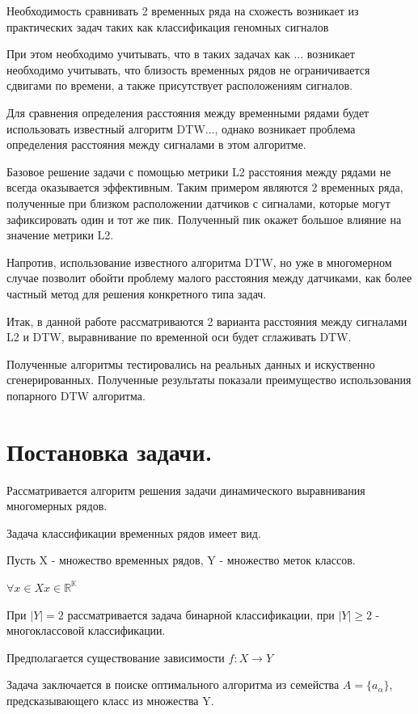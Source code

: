\documentclass[12pt, twoside]{article}
\begin{document}
Необходимость сравнивать 2 временных ряда на схожесть возникает из практических задач таких как классификация геномных сигналов \cite{SalvadorC07} 

При этом необходимо учитывать, что в таких задачах как ... возникает необходимо учитывать, что близость временных рядов не ограничивается сдвигами по времени, а также присутствует  расположениям сигналов.

Для сравнения определения расстояния между временными рядами будет использовать известный алгоритм DTW..., однако возникает проблема определения расстояния между сигналами в этом алгоритме.

Базовое решение задачи с помощью метрики L2 расстояния между рядами не всегда оказывается эффективным. Таким примером являются 2 временных ряда, полученные при близком расположении датчиков с сигналами, которые могут зафиксировать один и тот же пик. Полученный пик окажет большое влияние на значение метрики L2.

Напротив, использование известного алгоритма DTW, но уже в многомерном случае позволит обойти проблему малого расстояния между датчиками, как более частный метод для решения конкретного типа задач.

Итак, в данной работе рассматриваются 2 варианта расстояния между сигналами L2 и DTW, выравнивание по временной оси будет сглаживать DTW.

Полученные алгоритмы тестировались на реальных данных и искуственно сгенерированных. Полученные результаты показали преимущество использования попарного DTW алгоритма.


\section{Постановка задачи.}

Рассматривается алгоритм решения задачи динамического выравнивания многомерных рядов.

Задача классификации временных рядов имеет вид.

Пусть X - множество временных рядов, Y - множество меток классов.

$\forall x \in X x \in \mathbb{R^K}$

При $|Y| = 2$ рассматривается задача бинарной классификации, при $|Y| \geq 2$ - многоклассовой классификации.

Предполагается существование зависимости $f: X \rightarrow Y$

Задача заключается в поиске оптимального алгоритма из семейства $A = \{a_{\alpha}\}$, предсказывающего класс из множества Y.
\end{document}
